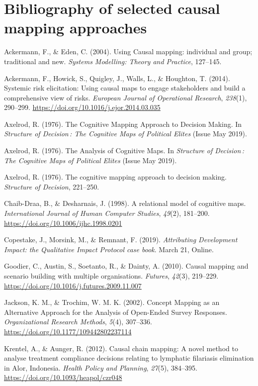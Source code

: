 \documentclass[
]{book}
\begin{document}
\hypertarget{bibliography-of-selected-causal-mapping-approaches}{%
\section{Bibliography of selected causal mapping approaches}\label{bibliography-of-selected-causal-mapping-approaches}}

Ackermann, F., \& Eden, C. (2004). Using Causal mapping: individual and group; traditional and new. \emph{Systems Modelling: Theory and Practice}, 127--145.

Ackermann, F., Howick, S., Quigley, J., Walls, L., \& Houghton, T. (2014). Systemic risk elicitation: Using causal maps to engage stakeholders and build a comprehensive view of risks. \emph{European Journal of Operational Research}, \emph{238}(1), 290--299. \url{https://doi.org/10.1016/j.ejor.2014.03.035}

Axelrod, R. (1976). The Cognitive Mapping Approach to Decision Making. In \emph{Structure of Decision\,: The Cognitive Maps of Political Elites} (Issue May 2019).

Axelrod, R. (1976). The Analysis of Cognitive Maps. In \emph{Structure of Decision\,: The Cognitive Maps of Political Elites} (Issue May 2019).

Axelrod, R. (1976). The cognitive mapping approach to decision making. \emph{Structure of Decision}, 221--250.

Chaib-Draa, B., \& Desharnais, J. (1998). A relational model of cognitive maps. \emph{International Journal of Human Computer Studies}, \emph{49}(2), 181--200. \url{https://doi.org/10.1006/ijhc.1998.0201}

Copestake, J., Morsink, M., \& Remnant, F. (2019). \emph{Attributing Development Impact: the Qualitative Impact Protocol case book}. March 21, Online.

Goodier, C., Austin, S., Soetanto, R., \& Dainty, A. (2010). Causal mapping and scenario building with multiple organisations. \emph{Futures}, \emph{42}(3), 219--229. \url{https://doi.org/10.1016/j.futures.2009.11.007}

Jackson, K. M., \& Trochim, W. M. K. (2002). Concept Mapping as an Alternative Approach for the Analysis of Open-Ended Survey Responses. \emph{Organizational Research Methods}, \emph{5}(4), 307--336. \url{https://doi.org/10.1177/109442802237114}

Krentel, A., \& Aunger, R. (2012). Causal chain mapping: A novel method to analyse treatment compliance decisions relating to lymphatic filariasis elimination in Alor, Indonesia. \emph{Health Policy and Planning}, \emph{27}(5), 384--395. \url{https://doi.org/10.1093/heapol/czr048}
\end{document}
